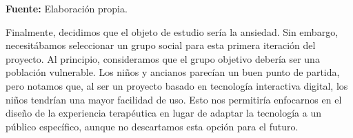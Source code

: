 \begin{table}[h!]
	\centering
		\caption{Comparación de emociones limitantes contra sus respectivas potenciadoras.}
		\label{tab:Emotions}
		\vspace{-30pt}
\end{table}

\begin{center}
	\textbf{Fuente:} Elaboración propia.	
\end{center}

Finalmente, decidimos que el objeto de estudio sería la ansiedad. Sin embargo, necesitábamos seleccionar un grupo social para esta primera iteración del proyecto. Al principio, consideramos que el grupo objetivo debería ser una población vulnerable. Los niños y ancianos parecían un buen punto de partida, pero notamos que, al ser un proyecto basado en tecnología interactiva digital, los niños tendrían una mayor facilidad de uso. Esto nos permitiría enfocarnos en el diseño de la experiencia terapéutica en lugar de adaptar la tecnología a un público específico, aunque no descartamos esta opción para el futuro. 

